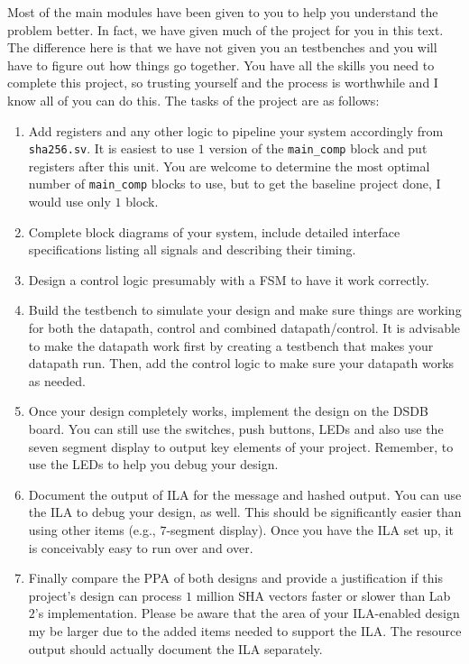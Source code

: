 \documentclass{article}
\begin{document}
Most of the main modules have been given to you to help you understand the
problem better.   In fact, we have given much of the project for you
in this text.  The difference here is that we have not given you an
testbenches and you will have to figure out how things go together.
You have all the skills you need to complete this project, so trusting
yourself and the process is worthwhile and I know all of you can do
this.  The tasks of the project are as follows:
\begin{enumerate}
  \item Add registers and any other logic to pipeline your system
    accordingly from \verb!sha256.sv!.  It is easiest to use $1$
    version of the \verb!main_comp! block and put registers after this
    unit.  You are welcome to determine the most optimal number of
    \verb!main_comp! blocks to use, but to get the baseline project
    done, I would use only $1$ block.
  \item Complete block diagrams of your system, include detailed
    interface specifications listing all signals and describing their
    timing.
  \item Design a control logic presumably with a FSM to have it work
  correctly.
\item  Build the testbench to simulate your design and make sure
  things are working for both the datapath, control and combined
  datapath/control. It is advisable to make the datapath work first by
  creating a testbench that makes your datapath run.  Then, add the
  control logic to make sure your datapath works as needed.
  \item Once your design completely works, implement the design on
    the DSDB board.  You can still use the switches, push
    buttons, LEDs and also use the
    seven segment display to output key elements of your project.
    Remember, to use the LEDs to help you debug your design.
  \item Document the output of ILA for the message and hashed output.
    You can use the ILA to debug your design, as well.  This should be
    significantly easier than using other items (e.g., $7$-segment
    display).  Once you have the ILA set up, it is conceivably easy to
    run over and over.
  \item Finally compare the PPA of both designs and provide a
    justification if this project's design can process $1$ million SHA
    vectors faster or slower than Lab~$2$'s implementation.  Please be
    aware that the area of your ILA-enabled design my be larger due to
    the added items needed to support the ILA.  The resource output
    should actually document the ILA separately.  
\end{enumerate}
\end{document}
